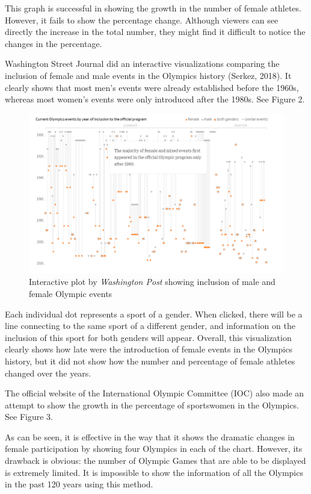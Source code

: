 \documentclass[12pt]{article}
\begin{document}
This graph is successful in showing the growth in the number of female athletes. However, it fails to show the percentage change. Although viewers can see directly the increase in the total number, they might find it difficult to notice the changes in the percentage. 

Washington Street Journal did an interactive visualizations comparing the inclusion of female and male events in the Olympics history (Serkez, 2018). It clearly shows that most men’s events were already established before the 1960s, whereas most women’s events were only introduced after the 1980s. See Figure 2. 

\begin{figure}[!b]
    \centering
    \includegraphics[scale=0.3]{pics/1-4.png}
    \caption{Interactive plot by \textit{Washington Post} showing inclusion of male and female Olympic events}
    \label{fig:my_label}
\end{figure}
\FloatBarrier %

Each individual dot represents a sport of a gender. When clicked, there will be a line connecting to the same sport of a different gender, and information on the inclusion of this sport for both genders will appear. Overall, this visualization clearly shows how late were the introduction of female events in the Olympics history, but it did not show how the number and percentage of female athletes changed over the years. 

The official website of the International Olympic Committee (IOC) also made an attempt to show the growth in the percentage of sportswomen in the Olympics. See Figure 3.

As can be seen, it is effective in the way that it shows the dramatic changes in female participation by showing four Olympics in each of the chart. However, its drawback is obvious: the number of Olympic Games that are able to be displayed is extremely limited. It is impossible to show the information of all the Olympics in the past 120 years using this method. 
\end{document}
